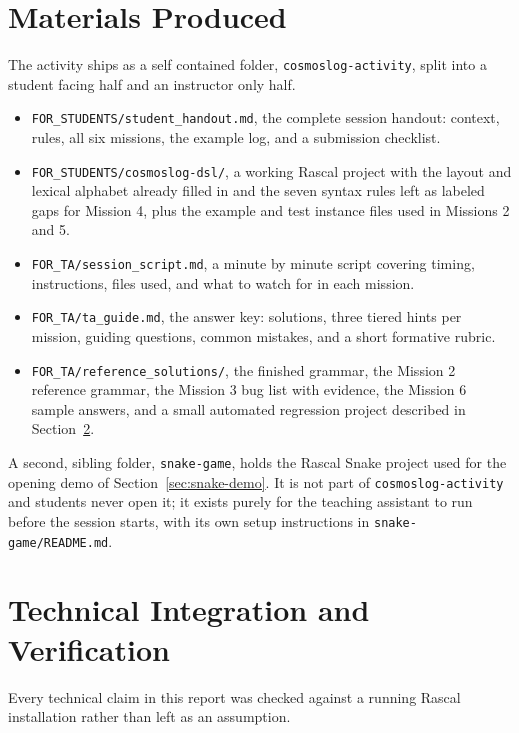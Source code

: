 \documentclass[11pt]{article}
\begin{document}
\section{Materials Produced}

The activity ships as a self contained folder, \texttt{cosmoslog-activity},
split into a student facing half and an instructor only half.

\begin{itemize}[nosep]
  \item \texttt{FOR\_STUDENTS/student\_handout.md}, the complete session
    handout: context, rules, all six missions, the example log, and a
    submission checklist.
  \item \texttt{FOR\_STUDENTS/cosmoslog-dsl/}, a working Rascal project
    with the layout and lexical alphabet already filled in and the seven
    syntax rules left as labeled gaps for Mission 4, plus the example and
    test instance files used in Missions 2 and 5.
  \item \texttt{FOR\_TA/session\_script.md}, a minute by minute script
    covering timing, instructions, files used, and what to watch for in
    each mission.
  \item \texttt{FOR\_TA/ta\_guide.md}, the answer key: solutions, three
    tiered hints per mission, guiding questions, common mistakes, and a
    short formative rubric.
  \item \texttt{FOR\_TA/reference\_solutions/}, the finished grammar, the
    Mission 2 reference grammar, the Mission 3 bug list with evidence, the
    Mission 6 sample answers, and a small automated regression project
    described in Section~\ref{sec:verification}.
\end{itemize}

A second, sibling folder, \texttt{snake-game}, holds the Rascal Snake
project used for the opening demo of Section~\ref{sec:snake-demo}. It is
not part of \texttt{cosmoslog-activity} and students never open it; it
exists purely for the teaching assistant to run before the session
starts, with its own setup instructions in \texttt{snake-game/README.md}.

\section{Technical Integration and Verification}
\label{sec:verification}

Every technical claim in this report was checked against a running Rascal
installation rather than left as an assumption.
\end{document}
